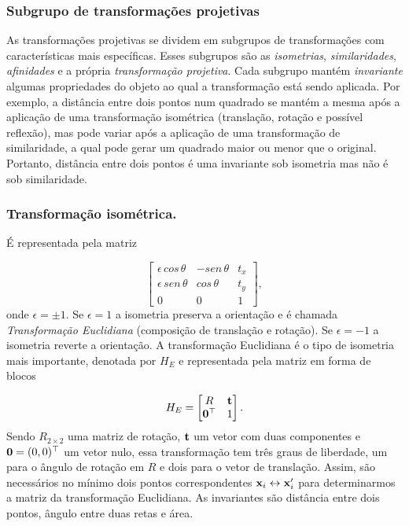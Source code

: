\subsubsection{Subgrupo de transformações projetivas}\label{sec.hierarquia-transformacoes}

As transformações projetivas se dividem em subgrupos de transformações com características mais específicas. Esses subgrupos são as \textit{isometrias}, \textit{similaridades}, \textit{afinidades} e a própria \textit{transformação projetiva}. Cada subgrupo mantém \textit{invariante} algumas propriedades do objeto ao qual a transformação está sendo aplicada. Por exemplo, a distância entre dois pontos num quadrado se mantém a mesma após a aplicação de uma transformação isométrica (translação, rotação e possível reflexão), mas pode variar após a aplicação de uma transformação de similaridade, a qual pode gerar um quadrado maior ou menor que o original. Portanto, distância entre dois pontos é uma invariante sob isometria mas não é sob similaridade.

\subsubsection*{Transformação isométrica.}
É representada pela matriz

\begin{equation*}
\begin{bmatrix}
\epsilon\,cos\,\theta&-sen\,\theta&t_x\\
\epsilon\,sen\,\theta&cos\,\theta&t_y\\
0&0&1
\end{bmatrix},
\end{equation*}
onde $\epsilon=\pm1$. Se $\epsilon=1$ a isometria preserva a orientação e é chamada \textit{Transformação Euclidiana} (composição de translação e rotação). Se $\epsilon=-1$ a isometria reverte a orientação. A transformação Euclidiana é o tipo de isometria mais importante, denotada por $H_E$ e representada pela matriz em forma de blocos

\begin{equation*}
H_E=
\begin{bmatrix}
R&{\bf t}\\
{\bf 0}^\top&1
\end{bmatrix}.
\end{equation*}
Sendo $R_{2\times2}$ uma matriz de rotação, ${\bf t}$ um vetor com duas componentes e ${\bf 0}=(0,0)^\top$ um vetor nulo, essa transformação tem três graus de liberdade, um para o ângulo de rotação em $R$ e dois para o vetor de translação. Assim, são necessários no mínimo dois pontos correspondentes $\mathbf{x}_i\leftrightarrow\mathbf{x}'_i$ para determinarmos a matriz da transformação Euclidiana. As invariantes são distância entre dois pontos, ângulo entre duas retas e área. 

